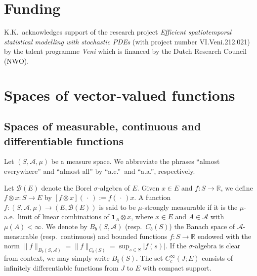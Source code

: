 \documentclass[reqno]{amsart}
\numberwithin{equation}{section}
\newcommand{\R}{\mathbb{R}}
\newcommand{\cB}{\mathcal{B}}
\newcommand{\norm}[2]{     \| #1       \|_{ #2 }}
\newcommand{\from}{\colon}
\theoremstyle{remark}
\theoremstyle{definition}
\begin{document}
\section*{Funding}

K.K.\ acknowledges support 
of the research project 
\emph{Efficient spatiotemporal statistical modelling 
	with stochastic PDEs} 
(with project number  
VI.Veni.212.021) 
by the talent programme \emph{Veni}
which is financed by 
the Dutch Research Council (NWO).

\appendix


\section{Spaces of vector-valued functions}\label{app:mixed-norm-bochner}
\subsection{Spaces of measurable, continuous and differentiable functions}
\label{subsec:app-func-spaces:measurable-cont}
Let $(S, \mathscr A, \mu)$ be a measure space.
We abbreviate the phrases 
``almost everywhere'' and 
``almost all'' 
by 
``a.e.''\ and ``a.a.''\!,  
respectively. 

Let $\cB(E)$ denote the Borel $\sigma$-algebra of $E$. 
Given $x \in E$ and $f \from S \to \R$, 
we define $f \otimes x \from S \to E$ by $[f\otimes x](\,\cdot\,) := f(\,\cdot\,)x$.
A function $f \from (S, \mathscr A, \mu) \to (E, \cB(E))$
is said to be $\mu$-strongly measurable if it is the $\mu$-a.e.\ limit 
of linear combinations of $\mathbf 1_{A} \otimes x$, where 
$x \in E$ and $A \in \mathscr A$ with $\mu(A) < \infty$.
%
We denote by $B_b(S, \mathscr A)$ (resp.\ $C_b(S)$) the Banach space of
$\mathscr A$-measurable (resp.\ continuous) and bounded functions $f \from S \to \R$ endowed with the 
norm $\norm{f}{B_b(S, \mathscr A)} = \norm{f}{C_b(S)} = \sup_{s \in S} \vert f(s) \vert$.
If the $\sigma$-algebra is clear from context, we may simply write $B_b(S)$.
The set $C_c^\infty(J; E)$ consists of infinitely differentiable functions 
from $J$ to $E$ with compact support.
\end{document}
